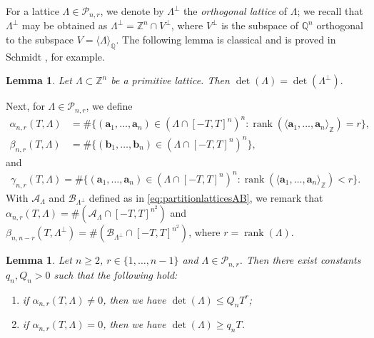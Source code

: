 \documentclass[11pt,reqno]{amsart}
\newtheorem{lem}[thm]{Lemma}
\theoremstyle{definition}
\theoremstyle{remark}
\numberwithin{equation}{section}
\numberwithin{thm}{section}
\numberwithin{table}{section}
\def \Q {{\mathbb Q}}
\def \Z {{\mathbb Z}}
\def\a{\mathbf{a}}
\def\b{\mathbf{b}}
\DeclareMathOperator{\rank}{rank}
\begin{document}
 For a lattice $\Lambda \in \mathcal{P}_{n,r}$, we denote by $\Lambda^\perp$ the {\it orthogonal lattice} of 
$\Lambda$; we recall that $\Lambda^\perp$ may be obtained as $\Lambda^\perp = \Z^n \cap V^\perp$, where $V^\perp$ is the subspace of $\Q^n$ orthogonal to the subspace $V = \langle \Lambda \rangle_{\Q}$. The following lemma is classical and is proved in Schmidt \cite[\S 2]{Schm}, for example. 

\begin{lem}\label{lem:detlatticeorthogonal}
        Let $\Lambda \subset \Z^n$ be a primitive lattice. Then 
        $
        \det(\Lambda) = \det(\Lambda^\perp).
        $
    \end{lem}


Next, for $\Lambda \in \mathcal{P}_{n,r}$, we define 
     \begin{align}
    \alpha_{n,r}(T,\Lambda) &= 
        \# 
    \{
    (\a_1, \ldots, \a_n) \in (\Lambda \cap [-T,T]^n)^n: \rank (\langle \a_1, \ldots, \a_n\rangle_{\Z}) = r
    \},
    \label{eq:defalpha}
    \\ \beta_{n,r}(T,\Lambda)
    &=
    \# \{ 
    (\b_1, \ldots, \b_n) \in (\Lambda \cap [-T,T]^n)^n
    \},
    \label{eq:defbeta}
    \end{align} and
    \begin{align} \label{eq:defgamma}
    \gamma_{n,r}(T,\Lambda) =  \# 
    \{
    (\a_1, \ldots, \a_n) \in (\Lambda \cap [-T,T]^n)^n: \rank (\langle \a_1, \ldots, \a_n\rangle_{\Z}) < r
    \}.
    \end{align}
    With $\mathcal{A}_{\Lambda}$ and $\mathcal{B}_{\Lambda^\perp}$ defined as in \eqref{eq:partitionlatticesAB}, we remark that $\alpha_{n,r}(T,\Lambda) = \# (\mathcal{A}_{\Lambda}\cap [-T,T]^{n^2})$ and $\beta_{n,n-r}(T,\Lambda^\perp) = \# (\mathcal{B}_{\Lambda^\perp} \cap [-T,T]^{n^2})$, where $r = \rank (\Lambda)$. 
       \begin{lem}\label{lem:condition_alphanonzero_detsize}
        Let $n \ge 2$, $r \in \{1, \ldots, n-1\}$ and $\Lambda \in \mathcal{P}_{n,r}$. 
        Then there exist constants $q_n,Q_n>0$ such that the following hold:
        \begin{enumerate}
            \item if $\alpha_{n,r}(T, \Lambda) \neq 0$, then we have $\det(\Lambda) \le Q_n T^{r}$;
            \item if 
            $\alpha_{n,r}(T, \Lambda) = 0$, then we have $\det(\Lambda) \ge q_nT$. 
        \end{enumerate}
    \end{lem}
\end{document}
